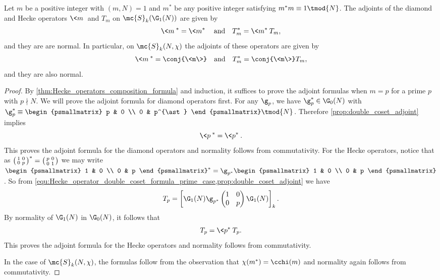 \documentclass[12pt]{article}
\begin{document}
      \begin{theorem}\label{thm:Hecke_operators_normal}
        Let \(m\) be a positive integer with \((m,N) = 1\) and \(m^{\ast}\) be any positive integer satisfying \(m^{\ast}m \equiv 1 \tmod{N}\). The adjoints of the diamond and Hecke operators \(\<m\>\) and \(T_{m}\) on \(\mc{S}_{k}(\G_{1}(N))\) are given by
        \[
          \<m\>^{\ast} = \<m^{\ast}\> \quad \text{and} \quad T_{m}^{\ast} = \<m^{\ast}\>T_{m},
        \]
        and they are are normal. In particular, on \(\mc{S}_{k}(N,\chi)\) the adjoints of these operators are given by
        \[
          \<m\>^{\ast} = \conj{\<m\>} \quad \text{and} \quad T_{m}^{\ast} = \conj{\<m\>}T_{m},
        \]
        and they are also normal.
      \end{theorem}
      \begin{proof}
        By \cref{thm:Hecke_operators_composition_formula} and induction, it suffices to prove the adjoint formulas when \(m = p\) for a prime \(p\) with \(p \nmid N\). We will prove the adjoint formula for diamond operators first. For any \(\g_{p}\), we have \(\g_{p}^{\ast} \in \G_{0}(N)\) with \(\g_{p}^{\ast} \equiv \begin{psmallmatrix} p & 0 \\ 0 & p^{\ast} \end{psmallmatrix} \tmod{N}\). Therefore \cref{prop:double_coset_adjoint} implies
        \[
          \<p\>^{\ast} = \<p^{\ast}\>.
        \]
        This proves the adjoint formula for the diamond operators and normality follows from commutativity. For the Hecke operators, notice that as \(\begin{psmallmatrix} 1 & 0 \\ 0 & p \end{psmallmatrix}^{\ast} = \begin{psmallmatrix} p & 0 \\ 0 & 1 \end{psmallmatrix}\) we may write \(\begin{psmallmatrix} 1 & 0 \\ 0 & p \end{psmallmatrix}^{\ast} = \g_{p^{\ast}}\begin{psmallmatrix} 1 & 0 \\ 0 & p \end{psmallmatrix}\). So from \cref{equ:Hecke_operator_double_coset_formula_prime_case,prop:double_coset_adjoint} we have
        \[
          T_{p} = \left[\G_{1}(N)\g_{p^{\ast}}\begin{pmatrix} 1 & 0 \\ 0 & p \end{pmatrix}\G_{1}(N)\right]_{k}.
        \]
        By normality of \(\G_{1}(N)\) in \(\G_{0}(N)\), it follows that
        \[
          T_{p} = \<p^{\ast}\>T_{p}.
        \]
        This proves the adjoint formula for the Hecke operators and normality follows from commutativity.

        In the case of \(\mc{S}_{k}(N,\chi)\), the formulas follow from the observation that \(\chi(m^{\ast}) = \cchi(m)\) and normality again follows from commutativity.
      \end{proof}
\end{document}
